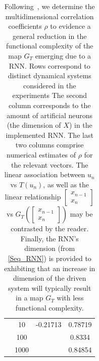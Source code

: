 \begin{table}
{\begin{tabular}{|c|c| c c |}
              & 10 & -0.21713 & 0.78719 \\
              & 100 & &  0.8334 \\
              & 1000 & & 0.84854 \\
           \bottomrule
                \end{tabular}}\label{Table_FC}%
     \caption{
              Following~\cite{manjunath2021universal}, we determine the multidimensional correlation coefficients $\rho$ to evidence a general reduction in the functional complexity of the map $G_T$ emerging due to a RNN. Rows correspond to distinct dynamical systems considered in the experiments
              The second column corresponds to the amount of artificial neurons (the dimension of $X$) in the implemented RNN.
              The last two columns comprise numerical estimates of $\rho$ for the relevant vectors. The linear association between $u_n$ vs $T(u_{n})$, as well as the linear relationship 
              $\begin{bmatrix}
                x_{n-1}\\
                x_n
            \end{bmatrix}$ vs 
            $G_T 
            \left({\begin{bmatrix}
                x_{n-1}\\
                x_n
            \end{bmatrix}}\right)$ 
              may be contrasted by the reader. 
              Finally, the RNN's dimension (from \eqref{Seq_RNN})
              is provided to exhibiting that an increase in dimension of the driven system will 
              typically result in a map $G_T$ with less functional complexity.}
      \end{table}\label{tbl_attractorsPearson}
